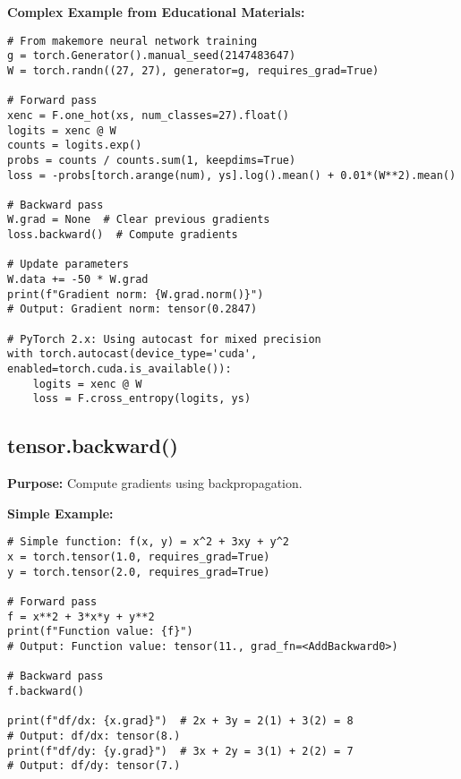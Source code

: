\documentclass[11pt,a4paper]{book}
\begin{document}
\textbf{Complex Example from Educational Materials:}
\begin{verbatim}
# From makemore neural network training
g = torch.Generator().manual_seed(2147483647)
W = torch.randn((27, 27), generator=g, requires_grad=True)

# Forward pass
xenc = F.one_hot(xs, num_classes=27).float()
logits = xenc @ W
counts = logits.exp()
probs = counts / counts.sum(1, keepdims=True)
loss = -probs[torch.arange(num), ys].log().mean() + 0.01*(W**2).mean()

# Backward pass
W.grad = None  # Clear previous gradients
loss.backward()  # Compute gradients

# Update parameters
W.data += -50 * W.grad
print(f"Gradient norm: {W.grad.norm()}")
# Output: Gradient norm: tensor(0.2847)

# PyTorch 2.x: Using autocast for mixed precision
with torch.autocast(device_type='cuda', enabled=torch.cuda.is_available()):
    logits = xenc @ W
    loss = F.cross_entropy(logits, ys)
\end{verbatim}

\subsection{tensor.backward()}

\textbf{Purpose:} Compute gradients using backpropagation.

\textbf{Simple Example:}
\begin{verbatim}
# Simple function: f(x, y) = x^2 + 3xy + y^2
x = torch.tensor(1.0, requires_grad=True)
y = torch.tensor(2.0, requires_grad=True)

# Forward pass
f = x**2 + 3*x*y + y**2
print(f"Function value: {f}")
# Output: Function value: tensor(11., grad_fn=<AddBackward0>)

# Backward pass
f.backward()

print(f"df/dx: {x.grad}")  # 2x + 3y = 2(1) + 3(2) = 8
# Output: df/dx: tensor(8.)
print(f"df/dy: {y.grad}")  # 3x + 2y = 3(1) + 2(2) = 7
# Output: df/dy: tensor(7.)
\end{verbatim}
\end{document}
